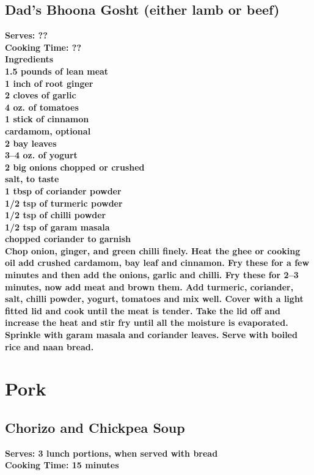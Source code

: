 \documentclass[18pt, oneside]{book}
\begin{document}
\section{Dad's Bhoona Gosht (either lamb or beef)}
\label{bhoona}
\bf{Serves: ??} \\
\bf{Cooking Time: ??} \\

\bf{Ingredients} \normalfont \\
1.5 pounds of lean meat \\
1 inch of root ginger \\
2 cloves of garlic \\
4 oz. of tomatoes \\
1 stick of cinnamon \\
cardamom, optional \\
2 bay leaves \\
3--4 oz. of yogurt \\
2 big onions chopped or crushed \\
salt, to taste \\
1 tbsp of coriander powder \\
1/2 tsp of turmeric powder \\
1/2 tsp of chilli powder \\
1/2 tsp of garam masala \\
chopped coriander to garnish \\

Chop onion, ginger, and green chilli finely. Heat the ghee or cooking oil add crushed cardamom, bay leaf and cinnamon. Fry these for a few minutes and then add the onions, garlic and chilli. Fry these for 2--3 minutes, now add meat and brown them. Add turmeric, coriander, salt, chilli powder, yogurt, tomatoes and mix well. Cover with a light fitted lid and cook until the meat is tender. Take the lid off and increase the heat and stir fry until all the moisture is evaporated. Sprinkle with garam masala and coriander leaves. Serve with boiled rice and naan bread. 

\chapter{Pork}

\section{Chorizo and Chickpea Soup}
\textbf{Serves: 3 lunch portions, when served with bread} \\
\textbf{Cooking Time: 15 minutes} \\ 
\end{document}
